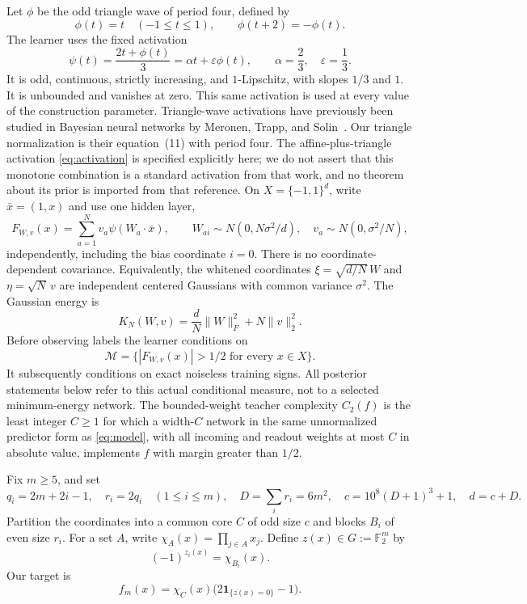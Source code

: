 \documentclass[11pt]{article}
\newcommand{\F}{\mathbb F}
\newcommand{\one}{\mathbf 1}
\newcommand{\eps}{\varepsilon}
\begin{document}
Let $\phi$ be the odd triangle wave of period four, defined by
\[
 \phi(t)=t\quad(-1\le t\le1),\qquad
 \phi(t+2)=-\phi(t).
\]
The learner uses the fixed activation
\begin{equation}\label{eq:activation}
 \psi(t)=\frac{2t+\phi(t)}3=\alpha t+\eps\phi(t),
 \qquad \alpha=\frac23,\quad\eps=\frac13.
\end{equation}
It is odd, continuous, strictly increasing, and $1$-Lipschitz, with
slopes $1/3$ and $1$. It is unbounded and vanishes at zero. This same
activation is used at every value of the construction parameter.
Triangle-wave activations have previously been studied in Bayesian
neural networks by Meronen, Trapp, and Solin~\cite[Section~3.2]{meronen2021periodic}.
Our triangle normalization is their equation~(11) with period four.
The affine-plus-triangle activation \eqref{eq:activation} is specified
explicitly here; we do not assert that this monotone combination is a
standard activation from that work, and no theorem about its prior is
imported from that reference.
On $X=\{-1,1\}^d$, write $\bar x=(1,x)$ and use one hidden layer,
\begin{equation}\label{eq:model}
 F_{W,v}(x)=\sum_{a=1}^N v_a\psi(W_a\cdot\bar x),\qquad
 W_{ai}\sim N(0,N\sigma^2/d),\quad
 v_a\sim N(0,\sigma^2/N),
\end{equation}
independently, including the bias coordinate $i=0$. There is no
coordinate-dependent covariance. Equivalently, the whitened coordinates
$\xi=\sqrt{d/N}\,W$ and $\eta=\sqrt N\,v$ are independent centered
Gaussians with common variance $\sigma^2$. The Gaussian energy is
\begin{equation}\label{eq:energy}
 K_N(W,v)=\frac dN\|W\|_F^2+N\|v\|_2^2.
\end{equation}
Before observing labels the learner conditions on
\begin{equation}\label{eq:globalmargin}
 \mathcal M=\{|F_{W,v}(x)|>1/2\text{ for every }x\in X\}.
\end{equation}
It subsequently conditions on exact noiseless training signs. All
posterior statements below refer to this actual conditional measure,
not to a selected minimum-energy network.
The bounded-weight teacher complexity $C_2(f)$ is the least integer
$C\ge1$ for which a width-$C$ network in the same unnormalized predictor
form as \eqref{eq:model}, with all incoming and readout weights at most
$C$ in absolute value, implements $f$ with margin greater than $1/2$.

Fix $m\ge5$, and set
\begin{equation}\label{eq:dimensions}
 q_i=2m+2i-1,\quad r_i=2q_i\quad(1\le i\le m),\quad
 D=\sum_i r_i=6m^2,\quad
 c=10^8(D+1)^3+1,\quad d=c+D.
\end{equation}
Partition the coordinates into a common core $C$ of odd size $c$ and
blocks $B_i$ of even size $r_i$. For a set $A$, write
$\chi_A(x)=\prod_{j\in A}x_j$. Define $z(x)\in G:=\F_2^m$ by
\[
 (-1)^{z_i(x)}=\chi_{B_i}(x).
\]
Our target is
\begin{equation}\label{eq:target}
 f_m(x)=\chi_C(x)\bigl(2\one_{\{z(x)=0\}}-1\bigr).
\end{equation}
\end{document}
